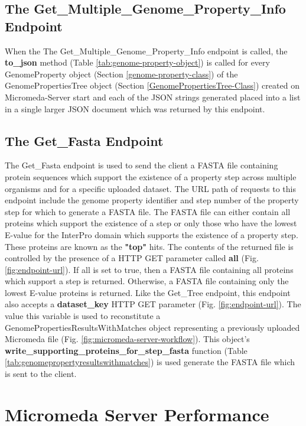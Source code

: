 \subsection{The Get\_Multiple\_Genome\_Property\_Info Endpoint}

When the The Get\_Multiple\_Genome\_Property\_Info endpoint is called, the \textbf{to\_json} method (Table \ref{tab:genome-property-object}) is called for every GenomeProperty object (Section \ref{genome-property-class}) of the GenomePropertiesTree object (Section \ref{GenomePropertiesTree-Class}) created on Micromeda-Server start and each of the JSON strings generated placed into a list in a single larger JSON document which was returned by this endpoint. 

\subsection{The Get\_Fasta Endpoint} \label{get-fasta-endpoint}

The Get\_Fasta endpoint is used to send the client a FASTA file containing protein sequences which support the existence of a property step across multiple organisms and for a specific uploaded dataset. The URL path of requests to this endpoint include the genome property identifier and step number of the property step for which to generate a FASTA file. The FASTA file can either contain all proteins which support the existence of a step or only those who have the lowest E-value for the InterPro domain which supports the existence of a property step. These proteins are known as the \textbf{"top"} hits. The contents of the returned file is controlled by the presence of a HTTP GET parameter called \textbf{all} (Fig. \ref{fig:endpoint-url}). If all is set to true, then a FASTA file containing all proteins which support a step is returned. Otherwise, a FASTA file containing only the lowest E-value proteins is returned. Like the Get\_Tree endpoint, this endpoint also accepts a \textbf{dataset\_key} HTTP GET parameter (Fig. \ref{fig:endpoint-url}). The value this variable is used to reconstitute a GenomePropertiesResultsWithMatches object representing a previously uploaded Micromeda file (Fig. \ref{fig:micromeda-server-workflow}). This object's \textbf{write\_supporting\_proteins\_for\_step\_fasta} function (Table \ref{tab:genomepropertyresultswithmatches}) is used generate the FASTA file which is sent to the client.

\section{Micromeda Server Performance} \label{micromeda-server-performance}

